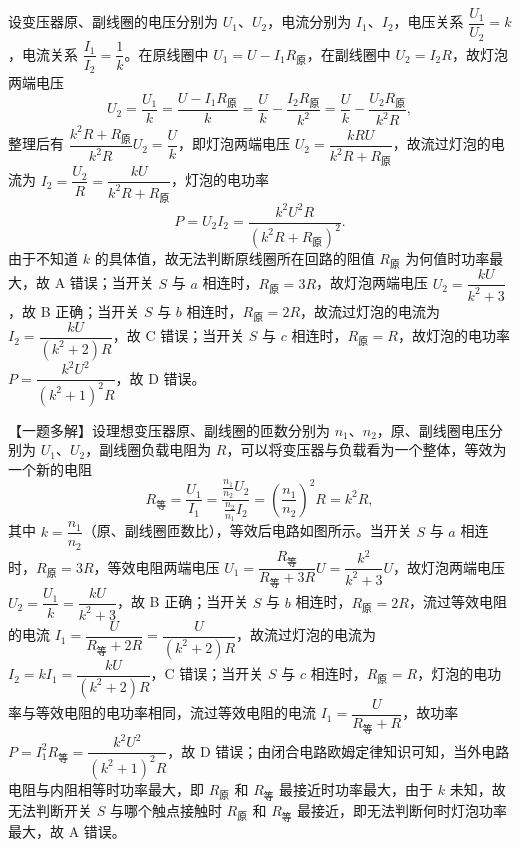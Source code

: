 \begin{answer}
设变压器原、副线圈的电压分别为 $U_{1}$、$U_{2}$，电流分别为 $I_{1}$、$I_{2}$，电压关系 $\dfrac{U_{1}}{U_{2}}=k$，电流关系 $\dfrac{I_{1}}{I_{2}}=\dfrac{1}{k}$。在原线圈中 $U_{1}=U-I_{1}R_{\text{原}}$，在副线圈中 $U_{2}=I_{2}R$，故灯泡两端电压
\[
  U_{2}=\frac{U_{1}}{k}=\frac{U-I_{1}R_{\text{原}}}{k}
      =\frac{U}{k}-\frac{I_{2}R_{\text{原}}}{k^{2}}
      =\frac{U}{k}-\frac{U_{2}R_{\text{原}}}{k^{2}R},
\]
整理后有 $\dfrac{k^{2}R+R_{\text{原}}}{k^{2}R}U_{2}=\dfrac{U}{k}$，即灯泡两端电压 $U_{2}=\dfrac{kRU}{k^{2}R+R_{\text{原}}}$，故流过灯泡的电流为 $I_{2}=\dfrac{U_{2}}{R}=\dfrac{kU}{k^{2}R+R_{\text{原}}}$，灯泡的电功率
\[
  P=U_{2}I_{2}=\frac{k^{2}U^{2}R}{(k^{2}R+R_{\text{原}})^{2}}.
\]
由于不知道 $k$ 的具体值，故无法判断原线圈所在回路的阻值 $R_{\text{原}}$ 为何值时功率最大，故 A 错误；当开关 $S$ 与 $a$ 相连时，$R_{\text{原}}=3R$，故灯泡两端电压 $U_{2}=\dfrac{kU}{k^{2}+3}$，故 B 正确；当开关 $S$ 与 $b$ 相连时，$R_{\text{原}}=2R$，故流过灯泡的电流为 $I_{2}=\dfrac{kU}{(k^{2}+2)R}$，故 C 错误；当开关 $S$ 与 $c$ 相连时，$R_{\text{原}}=R$，故灯泡的电功率 $P=\dfrac{k^{2}U^{2}}{(k^{2}+1)^{2}R}$，故 D 错误。

\begin{gktip}
【一题多解】设理想变压器原、副线圈的匝数分别为 $n_{1}$、$n_{2}$，原、副线圈电压分别为 $U_{1}$、$U_{2}$，副线圈负载电阻为 $R$，可以将变压器与负载看为一个整体，等效为一个新的电阻
\[
  R_{\text{等}}=\frac{U_{1}}{I_{1}}
      =\frac{\frac{n_{1}}{n_{2}}U_{2}}{\frac{n_{2}}{n_{1}}I_{2}}
      =\left(\frac{n_{1}}{n_{2}}\right)^{2}R=k^{2}R,
\]
其中 $k=\dfrac{n_{1}}{n_{2}}$（原、副线圈匝数比），等效后电路如图所示。当开关 $S$ 与 $a$ 相连时，$R_{\text{原}}=3R$，等效电阻两端电压 $U_{1}=\dfrac{R_{\text{等}}}{R_{\text{等}}+3R}U=\dfrac{k^{2}}{k^{2}+3}U$，故灯泡两端电压 $U_{2}=\dfrac{U_{1}}{k}=\dfrac{kU}{k^{2}+3}$，故 B 正确；当开关 $S$ 与 $b$ 相连时，$R_{\text{原}}=2R$，流过等效电阻的电流 $I_{1}=\dfrac{U}{R_{\text{等}}+2R}=\dfrac{U}{(k^{2}+2)R}$，故流过灯泡的电流为 $I_{2}=kI_{1}=\dfrac{kU}{(k^{2}+2)R}$，C 错误；当开关 $S$ 与 $c$ 相连时，$R_{\text{原}}=R$，灯泡的电功率与等效电阻的电功率相同，流过等效电阻的电流 $I_{1}=\dfrac{U}{R_{\text{等}}+R}$，故功率 $P=I_{1}^{2}R_{\text{等}}=\dfrac{k^{2}U^{2}}{(k^{2}+1)^{2}R}$，故 D 错误；由闭合电路欧姆定律知识可知，当外电路电阻与内阻相等时功率最大，即 $R_{\text{原}}$ 和 $R_{\text{等}}$ 最接近时功率最大，由于 $k$ 未知，故无法判断开关 $S$ 与哪个触点接触时 $R_{\text{原}}$ 和 $R_{\text{等}}$ 最接近，即无法判断何时灯泡功率最大，故 A 错误。

\end{gktip}
\end{answer}

